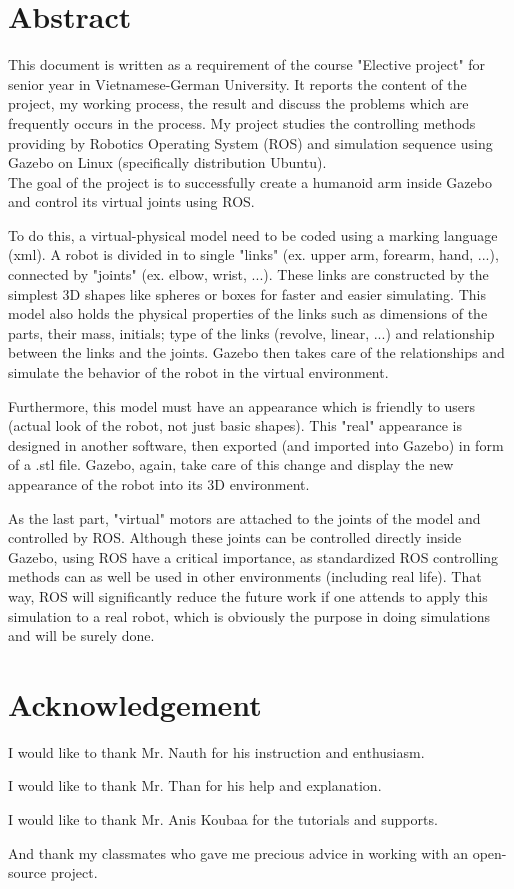 \documentclass[pdftex,12pt,a4paper]{article}
\begin{document}
  \section*{Abstract}
  This document is written as a requirement of the course "Elective project" for senior year in Vietnamese-German University. It reports the content of the project, my working process, the result and discuss the problems which are frequently occurs in the process.
  My project studies the controlling methods providing by Robotics Operating System (ROS) and simulation sequence using Gazebo on Linux (specifically distribution Ubuntu). \\
  The goal of the project is to successfully create a humanoid arm inside Gazebo and control its virtual joints using ROS.\par
  To do this, a virtual-physical model need to be coded using a marking language (xml). A robot is divided in to single "links" (ex. upper arm, forearm, hand, ...), connected by "joints" (ex. elbow, wrist, ...). These links are constructed by the simplest 3D shapes like spheres or boxes for faster and easier simulating. This model also holds the physical properties of the links such as dimensions of the parts, their mass, initials; type of the links (revolve, linear, ...) and relationship between the links and the joints. Gazebo then takes care of the relationships and simulate the behavior of the robot in the virtual environment.\par
  Furthermore, this model must have an appearance which is friendly to users (actual look of the robot, not just basic shapes). This "real" appearance is designed in another software, then exported (and imported into Gazebo) in form of a .stl file. Gazebo, again, take care of this change and display the new appearance of the robot into its 3D environment. \par
  As the last part, "virtual" motors are attached to the joints of the model and controlled by ROS. Although these joints can be controlled directly inside Gazebo, using ROS have a critical importance, as standardized ROS controlling methods can as well be used in other environments (including real life). That way, ROS will significantly reduce the future work if one attends to apply this simulation to a real robot, which is obviously the purpose in doing simulations and will be surely done.\par
  
  \newpage
  \section*{Acknowledgement}
  I would like to thank Mr. Nauth for his instruction and enthusiasm.\par
  I would like to thank Mr. Than for his help and explanation.\par
  I would like to thank Mr. Anis Koubaa for the tutorials and supports.\par
  And thank my classmates who gave me precious advice in working with an open-source project.
  
\end{document}
